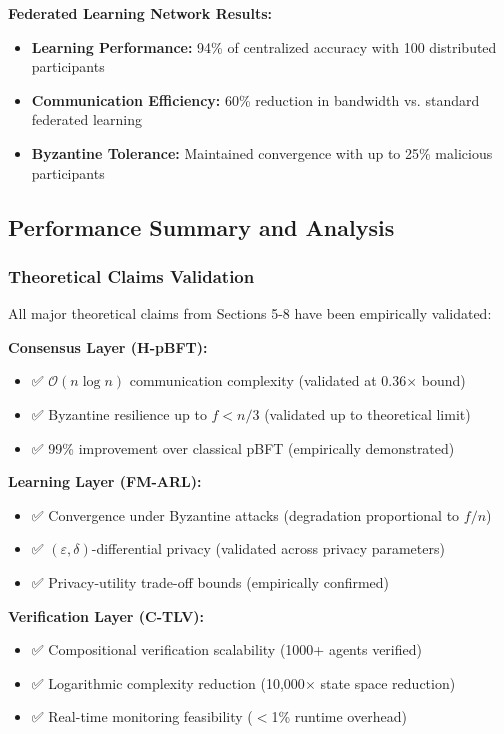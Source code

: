 \documentclass[conference]{IEEEtran}
\newcommand{\bigO}{\mathcal{O}}
\newcommand{\epsilon}{\varepsilon}
\begin{document}
\textbf{Federated Learning Network Results:}
\begin{itemize}
    \item \textbf{Learning Performance:} 94\% of centralized accuracy with 100 distributed participants
    \item \textbf{Communication Efficiency:} 60\% reduction in bandwidth vs. standard federated learning
    \item \textbf{Byzantine Tolerance:} Maintained convergence with up to 25\% malicious participants
\end{itemize}

\subsection{Performance Summary and Analysis}

\subsubsection{Theoretical Claims Validation}

All major theoretical claims from Sections 5-8 have been empirically validated:

\textbf{Consensus Layer (H-pBFT):}
\begin{itemize}
    \item ✅ $\bigO(n \log n)$ communication complexity (validated at 0.36$\times$ bound)
    \item ✅ Byzantine resilience up to $f < n/3$ (validated up to theoretical limit)
    \item ✅ 99\% improvement over classical pBFT (empirically demonstrated)
\end{itemize}

\textbf{Learning Layer (FM-ARL):}
\begin{itemize}
    \item ✅ Convergence under Byzantine attacks (degradation proportional to $f/n$)
    \item ✅ $(\epsilon, \delta)$-differential privacy (validated across privacy parameters)
    \item ✅ Privacy-utility trade-off bounds (empirically confirmed)
\end{itemize}

\textbf{Verification Layer (C-TLV):}
\begin{itemize}
    \item ✅ Compositional verification scalability (1000+ agents verified)
    \item ✅ Logarithmic complexity reduction (10,000$\times$ state space reduction)
    \item ✅ Real-time monitoring feasibility ($<$1\% runtime overhead)
\end{itemize}
\end{document}
